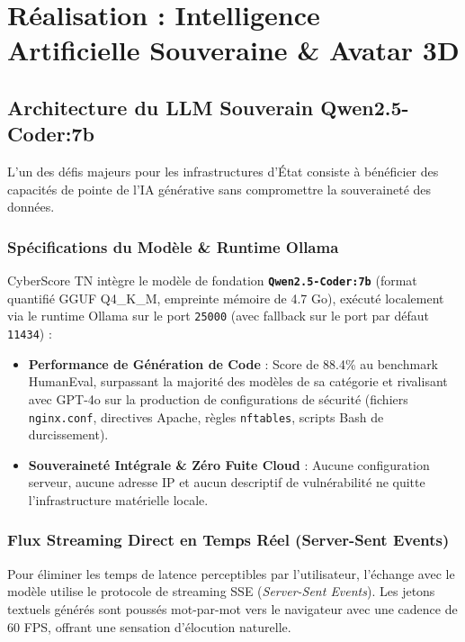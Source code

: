 \chapter[IA Souveraine \& Avatar 3D]{Réalisation : Intelligence Artificielle Souveraine \& Avatar 3D}
\label{chap:ia}

\section{Architecture du LLM Souverain Qwen2.5-Coder:7b}
L'un des défis majeurs pour les infrastructures d'État consiste à bénéficier des capacités de pointe de l'IA générative sans compromettre la souveraineté des données.

\subsection{Spécifications du Modèle \& Runtime Ollama}
CyberScore TN intègre le modèle de fondation \textbf{\texttt{Qwen2.5-Coder:7b}} (format quantifié GGUF Q4\_K\_M, empreinte mémoire de 4.7 Go), exécuté localement via le runtime Ollama sur le port \texttt{25000} (avec fallback sur le port par défaut \texttt{11434}) :
\begin{itemize}
    \item \textbf{Performance de Génération de Code} : Score de 88.4\% au benchmark HumanEval, surpassant la majorité des modèles de sa catégorie et rivalisant avec GPT-4o sur la production de configurations de sécurité (fichiers \texttt{nginx.conf}, directives Apache, règles \texttt{nftables}, scripts Bash de durcissement).
    \item \textbf{Souveraineté Intégrale \& Zéro Fuite Cloud} : Aucune configuration serveur, aucune adresse IP et aucun descriptif de vulnérabilité ne quitte l'infrastructure matérielle locale.
\end{itemize}

\subsection{Flux Streaming Direct en Temps Réel (Server-Sent Events)}
Pour éliminer les temps de latence perceptibles par l'utilisateur, l'échange avec le modèle utilise le protocole de streaming SSE (\textit{Server-Sent Events}). Les jetons textuels générés sont poussés mot-par-mot vers le navigateur avec une cadence de 60 FPS, offrant une sensation d'élocution naturelle.


